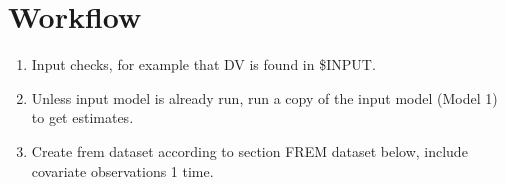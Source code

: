 \section{Workflow}
\begin{enumerate}
\item Input checks, for example that DV is found in \$INPUT.

\item Unless input model is already run,
run a copy of the input model (Model 1) to get estimates.
\item Create frem dataset according to section FREM dataset below, include covariate observations 1 time.


\end{enumerate}
